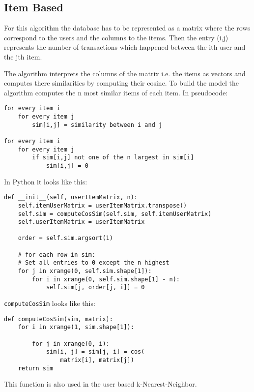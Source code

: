\subsection{Item Based}
\label{itembasedknn}

For this algorithm the database has to be represented as a matrix
where the rows correspond to the users and the columns to the items.
Then the entry (i,j) represents the number of transactions which happened
between the ith user and the jth item. 

The algorithm interprets the columns of the matrix i.e. the items
as vectors and computes there similarities by computing their cosine.
To build the model the algorithm computes the n most similar items
of each item. In pseudocode:
\begin{lstlisting}
for every item i
    for every item j
        sim[i,j] = similarity between i and j

for every item i
    for every item j
        if sim[i,j] not one of the n largest in sim[i]
            sim[i,j] = 0
\end{lstlisting}
In Python it looks like this:
\begin{lstlisting}
def __init__(self, userItemMatrix, n):
    self.itemUserMatrix = userItemMatrix.transpose()
    self.sim = computeCosSim(self.sim, self.itemUserMatrix)
    self.userItemMatrix = userItemMatrix

    order = self.sim.argsort(1)

    # for each row in sim:
    # Set all entries to 0 except the n highest
    for j in xrange(0, self.sim.shape[1]):
        for i in xrange(0, self.sim.shape[1] - n):
            self.sim[j, order[j, i]] = 0
\end{lstlisting}
\lstinline!computeCosSim! looks like this:
\begin{lstlisting}
def computeCosSim(sim, matrix):
    for i in xrange(1, sim.shape[1]):

        for j in xrange(0, i):
            sim[i, j] = sim[j, i] = cos(
                matrix[i], matrix[j])
    return sim
\end{lstlisting}
This function is also used in the user based k-Nearest-Neighbor.



